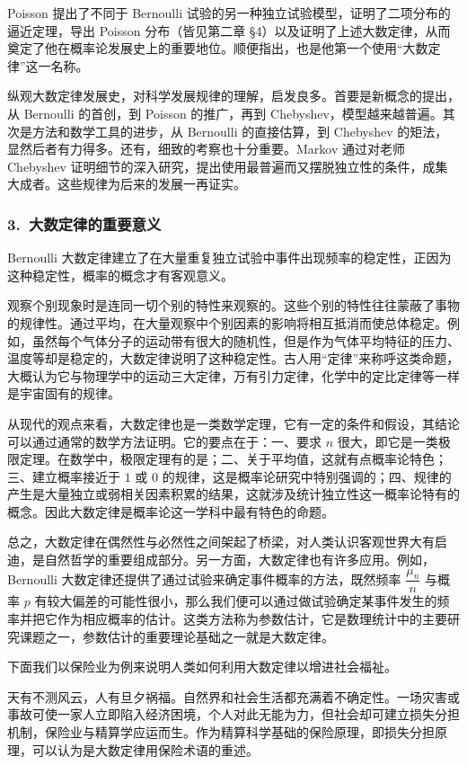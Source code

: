 \documentclass[../../main.tex]{subfiles}
\begin{document}
Poisson 提出了不同于 Bernoulli 试验的另一种独立试验模型，证明了二项分布的逼近定理，导出 Poisson 分布（皆见第二章 \S4）以及证明了上述大数定律，从而奠定了他在概率论发展史上的重要地位。顺便指出，也是他第一个使用``大数定律''这一名称。

纵观大数定律发展史，对科学发展规律的理解，启发良多。首要是新概念的提出，从 Bernoulli 的首创，到 Poisson 的推广，再到 Chebyshev，模型越来越普遍。其次是方法和数学工具的进步，从 Bernoulli 的直接估算，到 Chebyshev 的矩法，显然后者有力得多。还有，细致的考察也十分重要。Markov 通过对老师 Chebyshev 证明细节的深入研究，提出使用最普遍而又摆脱独立性的条件，成集大成者。这些规律为后来的发展一再证实。

\subsubsection*{3.\ 大数定律的重要意义}

Bernoulli 大数定律建立了在大量重复独立试验中事件出现频率的稳定性，正因为这种稳定性，概率的概念才有客观意义。

观察个别现象时是连同一切个别的特性来观察的。这些个别的特性往往蒙蔽了事物的规律性。通过平均，在大量观察中个别因素的影响将相互抵消而使总体稳定。例如，虽然每个气体分子的运动带有很大的随机性，但是作为气体平均特征的压力、温度等却是稳定的，大数定律说明了这种稳定性。古人用``定律''来称呼这类命题，大概认为它与物理学中的运动三大定律，万有引力定律，化学中的定比定律等一样是宇宙固有的规律。

从现代的观点来看，大数定律也是一类数学定理，它有一定的条件和假设，其结论可以通过通常的数学方法证明。它的要点在于：一、要求 $n$ 很大，即它是一类极限定理。在数学中，极限定理有的是；二、关于平均值，这就有点概率论特色；三、建立概率接近于 $1$ 或 $0$ 的规律，这是概率论研究中特别强调的；四、规律的产生是大量独立或弱相关因素积累的结果，这就涉及统计独立性这一概率论特有的概念。因此大数定律是概率论这一学科中最有特色的命题。

总之，大数定律在偶然性与必然性之间架起了桥梁，对人类认识客观世界大有启迪，是自然哲学的重要组成部分。另一方面，大数定律也有许多应用。例如，Bernoulli 大数定律还提供了通过试验来确定事件概率的方法，既然频率 $\dfrac{\mu_n}{n}$ 与概率 $p$ 有较大偏差的可能性很小，那么我们便可以通过做试验确定某事件发生的频率并把它作为相应概率的估计。这类方法称为参数估计，它是数理统计中的主要研究课题之一，参数估计的重要理论基础之一就是大数定律。

下面我们以保险业为例来说明人类如何利用大数定律以增进社会福祉。

天有不测风云，人有旦夕祸福。自然界和社会生活都充满着不确定性。一场灾害或事故可使一家人立即陷入经济困境，个人对此无能为力，但社会却可建立损失分担机制，保险业与精算学应运而生。作为精算科学基础的保险原理，即损失分担原理，可以认为是大数定律用保险术语的重述。
\end{document}
